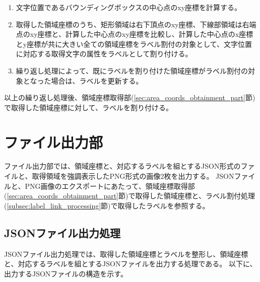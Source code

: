 \begin{enumerate}
    \item 文字位置であるバウンディングボックスの中心点のxy座標を計算する。
    \item 取得した領域座標のうち、矩形領域は右下頂点のxy座標、下線部領域は右端点のxy座標と、計算した中心点のxy座標を比較し、計算した中心点のx座標とy座標が共に大きい全ての領域座標をラベル割付の対象として、文字位置に対応する取得文字の属性をラベルとして割り付ける。
    \item 繰り返し処理によって、既にラベルを割り付けた領域座標がラベル割付の対象となった場合は、ラベルを更新する。
\end{enumerate}

以上の繰り返し処理後、領域座標取得部(\ref{sec:area_coords_obtainment_part}節)で取得した領域座標に対して、ラベルを割り付ける。

\section{ファイル出力部}\label{subsec:file_output_part}
ファイル出力部では、領域座標と、対応するラベルを組とするJSON形式のファイルと、取得領域を強調表示したPNG形式の画像2枚を出力する。
JSONファイルと、PNG画像のエクスポートにあたって、領域座標取得部(\ref{sec:area_coords_obtainment_part}節)で取得した領域座標と、ラベル割付処理(\ref{subsec:label_link_processing}節)で取得したラベルを参照する。


\subsection{JSONファイル出力処理}\label{subsec:json_file_output_processing}
JSONファイル出力処理では、取得した領域座標とラベルを整形し、領域座標と、対応するラベルを組とするJSONファイルを出力する処理である。
以下に、出力するJSONファイルの構造を示す。


